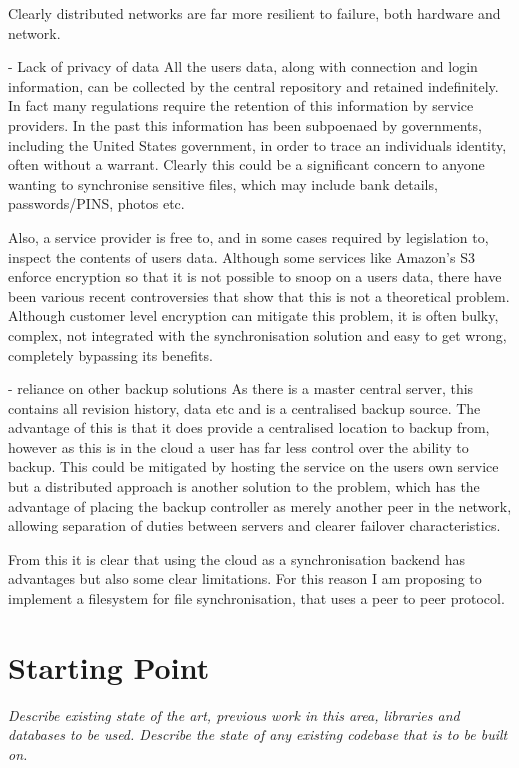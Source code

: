 Clearly distributed networks are far more resilient to failure, both hardware and network. 

- Lack of privacy of data
All the users data, along with connection and login information, can be collected by the central
repository and retained indefinitely. In fact many regulations require the retention of this
information by service providers. In the past this information has been subpoenaed by governments,
including the United States government, in order to trace an individuals identity, often without
a warrant. Clearly this could be a significant concern to anyone wanting to synchronise sensitive
files, which may include bank details, passwords/PINS, photos etc.

Also, a service provider is free to, and in some cases required by legislation to, inspect the
contents of users data. Although some services like Amazon's S3 enforce encryption so that it is
not possible to snoop on a users data, there have been various recent controversies that show that
this is not a theoretical problem. Although customer level encryption can mitigate this problem,
it is often bulky, complex, not integrated with the synchronisation solution and easy to get
wrong, completely bypassing its benefits.

- reliance on other backup solutions
As there is a master central server, this contains all revision history, data etc and is a
centralised backup source. The advantage of this is that it does provide a centralised location to
backup from, however as this is in the cloud a user has far less control over the ability to
backup. This could be mitigated by hosting the service on the users own service but a distributed
approach is another solution to the problem, which has the advantage of placing the backup
controller as merely another peer in the network, allowing separation of duties between servers
and clearer failover characteristics.

From this it is clear that using the cloud as a synchronisation backend has advantages but also
some clear limitations. For this reason I am proposing to implement a filesystem for file
synchronisation, that uses a peer to peer protocol.


\section*{Starting Point}

{\em Describe existing state of the art, previous work in this area, libraries and databases to be used.
Describe the state of any existing codebase that is to be built on.  }


